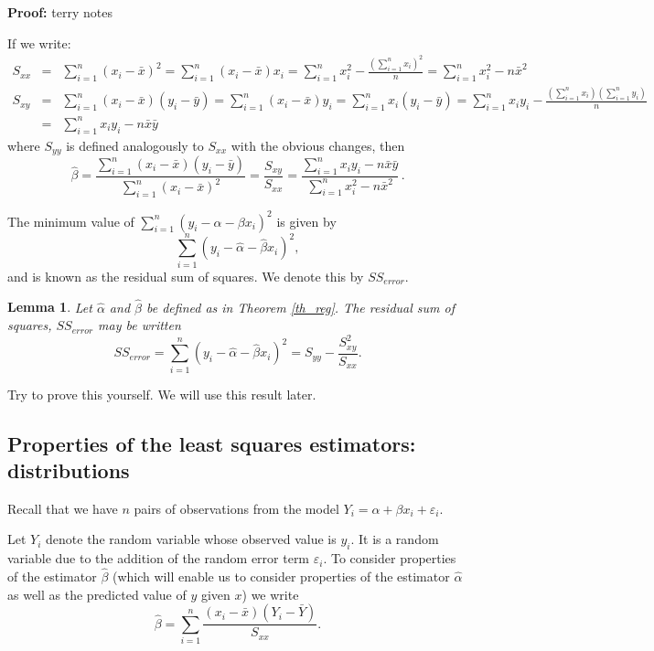 \documentclass[12pt]{article}
\theoremstyle{break}
\newtheorem{lemma}[theorem]{Lemma}
\begin{document}
\begin{mdframed}
{\bf Proof:}
\textcolor[rgb]{1.00,1.00,1.00}{terry notes\lipsum[1-7]}
\end{mdframed}

If we write:
\begin{eqnarray*}
S_{xx}&=&\sum_{i=1}^{n}(x_{i}-\bar{x})^{2}=\sum_{i=1}^{n}(x_{i}-\bar{x})x_{i}=\sum_{i=1}^{n}x_{i}^{2}-\frac{(\sum_{i=1}^{n}x_{i})^{2}}{n}=\sum_{i=1}^{n}x_{i}^{2}-n\bar{x}^{2}\\
S_{xy}&=&\sum_{i=1}^{n}(x_{i}-\bar{x})(y_{i}-\bar{y})=\sum_{i=1}^{n}(x_{i}-\bar{x})y_{i}=\sum_{i=1}^{n}x_{i}(y_{i}-\bar{y})=\sum_{i=1}^{n}x_{i}y_{i}-\frac{\left(\sum_{i=1}^{n}x_{i}\right)\left(\sum_{i=1}^{n}y_{i}\right)}{n}\\&=&\sum_{i=1}^{n}x_{i}y_{i}-n\bar{x}\bar{y}
\end{eqnarray*}
where $S_{yy}$ is defined analogously to $S_{xx}$ with the obvious changes, then $$\hat{\beta}=\frac{\sum_{i=1}^{n}(x_{i}-\bar{x})(y_{i}-\bar{y})}{\sum_{i=1}^{n}(x_{i}-\bar{x})^{2}}=\frac{S_{xy}}{S_{xx}}=\frac{\sum_{i=1}^{n}x_{i}y_{i}-n\bar{x}\bar{y}}{\sum_{i=1}^{n}x_{i}^{2}-n\bar{x}^{2}}\,.$$

The minimum value of $\sum_{i=1}^{n}(y_{i}-\alpha-\beta x_{i})^{2}$ is given by $$\sum_{i=1}^{n}(y_{i}-\hat{\alpha}-\hat{\beta} x_{i})^{2}, $$ and is known as the residual sum of squares. We denote this by $SS_{error}$.
\begin{lemma}
Let $\hat{\alpha}$ and $\hat{\beta}$ be defined as in Theorem \ref{th_reg}. The residual sum of squares, $SS_{error}$ may be written
$$SS_{error}=\sum_{i=1}^{n}(y_{i}-\hat{\alpha}-\hat{\beta} x_{i})^{2}=S_{yy}-\frac{S^{2}_{xy}}{S_{xx}}.$$
\end{lemma}
Try to prove this yourself. We will use this result later.

\subsection{Properties of the least squares estimators: distributions}
Recall that we have $n$ pairs of observations from the model $Y_{i}=\alpha+\beta x_{i} +\varepsilon_{i}$.

Let $Y_{i}$ denote the random variable whose observed value is $y_{i}$. It is a random variable due to the addition of the random error term $\varepsilon_{i}$. To consider properties of the estimator $\hat{\beta}$ (which will enable us to consider properties of the estimator $\hat{\alpha}$ as well as the predicted value of $y$ given $x$) we write
$$
\hat{\beta}=\sum_{i=1}^{n}\frac{(x_{i}-\bar{x})(Y_{i}-\bar{Y})}{S_{xx}}.
$$
\end{document}
